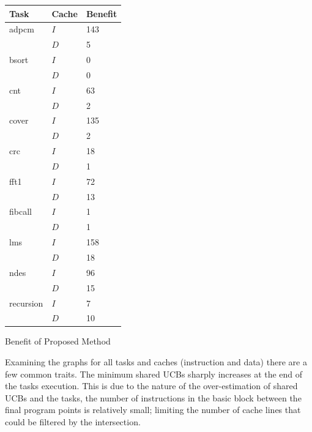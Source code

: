 \begin{minipage}{\linewidth}
\centering
    \begin{tabular}{l l | l}
      Task & Cache & Benefit \\
      \hline

      adpcm & ${I}$ & 143 \\
            & ${D}$ & 5 \\
      \hline

      bsort & ${I}$ & 0 \\
            & ${D}$ & 0 \\
      \hline

      cnt & ${I}$ & 63 \\
          & ${D}$ & 2 \\
      \hline

      cover & ${I}$ & 135 \\
            & ${D}$ & 2 \\
      \hline

      crc & ${I}$ & 18 \\
          & ${D}$ & 1 \\
      \hline

      fft1 & ${I}$ & 72 \\
           & ${D}$ & 13 \\
      \hline

      fibcall & ${I}$ & 1 \\
              & ${D}$ & 1 \\
      \hline

      lms & ${I}$ & 158 \\
          & ${D}$ & 18 \\
      \hline

      ndes & ${I}$ & 96 \\
           & ${D}$ & 15 \\
      \hline

      recursion & ${I}$ & 7 \\
                & ${D}$ & 10 \\
      \hline

    \end{tabular}
    \bigskip

    Benefit of Proposed Method
    \bigskip
\end{minipage}

Examining the graphs for all tasks and caches (instruction and data)
there are a few common traits. The minimum shared UCBs sharply
increases at the end of the tasks execution. This is due to the nature
of the over-estimation of shared UCBs and the tasks, the number of
instructions in the basic block between the final program points is
relatively small; limiting the number of cache lines that could be
filtered by the intersection.

